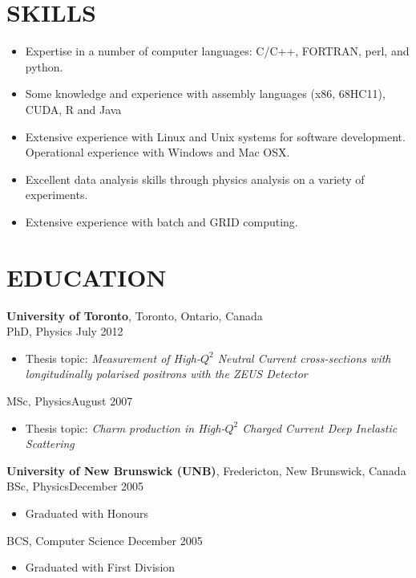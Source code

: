 \documentclass[margin]{res}
\begin{document}
\begin{resume}
\section{SKILLS}
\begin{itemize}
  \item Expertise in a number of computer languages: C/C++, FORTRAN, perl, and python.
  \item Some knowledge and experience with assembly languages (x86, 68HC11), CUDA, R and Java
  \item Extensive experience with Linux and Unix systems for software development. Operational experience with Windows and Mac OSX.
  \item Excellent data analysis skills through physics analysis on a variety of experiments. 
  \item Extensive experience with batch and GRID computing.
\end{itemize}

\section{EDUCATION}

{\bf University of Toronto}, Toronto, Ontario, Canada \\
PhD, Physics \hfill July 2012
\begin{itemize} \itemsep -2pt  %
\item Thesis topic: \textit{Measurement of High-$Q^2$ Neutral Current cross-sections with longitudinally polarised positrons with the ZEUS Detector}
\end{itemize}
MSc, Physics\hfill August 2007 
\begin{itemize} \itemsep -2pt  %
\item Thesis topic: \textit{Charm production in High-$Q^2$ Charged Current Deep Inelastic Scattering}
\end{itemize}
{\bf University of New Brunswick (UNB)}, Fredericton, New Brunswick, Canada \\
BSc, Physics\hfill December 2005
\begin{itemize} \itemsep -2pt  %
\item Graduated with Honours 
\end{itemize}
BCS, Computer Science \hfill December 2005
\begin{itemize} \itemsep -2pt  %
\item Graduated with First Division 
\end{itemize}


\end{resume}
\end{document}
